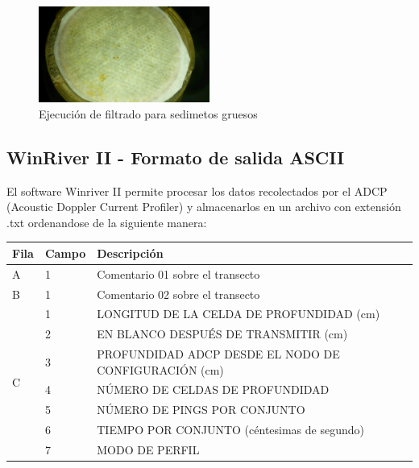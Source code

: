 \documentclass[12pt,a4paper]{report}
\begin{document}
\begin{figure}[h]
  \centering
    \includegraphics[width=0.5\textwidth]{imagenes/sedimentos_gruesos}
  \caption{Ejecución de filtrado para sedimetos gruesos}
  \label{fig:FiltroGrueso}
\end{figure}



\subsection{WinRiver II - Formato de salida ASCII}
El software Winriver II permite procesar los datos recolectados por el ADCP (Acoustic Doppler Current Profiler) y almacenarlos en un archivo con extensión .txt ordenandose de la siguiente manera:

\begin{table}[h]
\begin{tabular}{|l|l|l|}
\hline
Fila               & Campo & Descripción                                          \\ \hline
A                  & 1     & Comentario 01 sobre el transecto                     \\ \hline
B                  & 1     & Comentario 02 sobre el transecto                     \\ \hline
\multirow{7}{*}{C} & 1     & LONGITUD DE LA CELDA DE PROFUNDIDAD (cm)             \\ \cline{2-3} 
                   & 2     & EN BLANCO DESPUÉS DE TRANSMITIR (cm)                 \\ \cline{2-3} 
                   & 3     & PROFUNDIDAD ADCP DESDE EL NODO DE CONFIGURACIÓN (cm) \\ \cline{2-3} 
                   & 4     & NÚMERO DE CELDAS DE PROFUNDIDAD                      \\ \cline{2-3} 
                   & 5     & NÚMERO DE PINGS POR CONJUNTO                         \\ \cline{2-3} 
                   & 6     & TIEMPO POR CONJUNTO (céntesimas de segundo)          \\ \cline{2-3} 
                   & 7     & MODO DE PERFIL                                       \\ \hline
\end{tabular}
\end{table}
\end{document}
